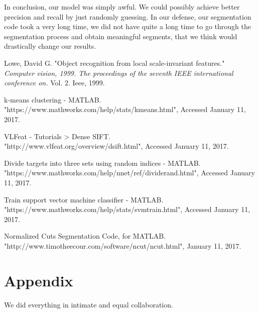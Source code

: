 \documentclass[conference]{IEEEtran}
\begin{document}
In conclusion, our model was simply awful. We could possibly achieve better precision and recall by just randomly guessing. In our defense, our segmentation code took a very long time, we did not have quite a long time to go through the segmentation process and obtain meaningful segments, that we think would drastically change our results. 


\begin{thebibliography}{20}


Lowe, David G. "Object recognition from local scale-invariant features." \textit{Computer vision, 1999. The proceedings of the seventh IEEE international conference on.} Vol. 2. Ieee, 1999.

 k-means clustering - MATLAB. \\
"https://www.mathworks.com/help/stats/kmeans.html", Accessed January 11, 2017.
  
 VLFeat - Tutorials > Dense SIFT. \\
"http://www.vlfeat.org/overview/dsift.html", Accessed January 11, 2017.

 Divide targets into three sets using random indices - MATLAB. \\
"https://www.mathworks.com/help/nnet/ref/dividerand.html", Accessed January 11, 2017.

 Train support vector machine classifier - MATLAB. \\
"https://www.mathworks.com/help/stats/svmtrain.html", Accessed January 11, 2017.

 Normalized Cuts Segmentation Code, for MATLAB. \\
"http://www.timotheecour.com/software/ncut/ncut.html", January 11, 2017.

\end{thebibliography}

\section*{Appendix}

We did everything in intimate and equal collaboration.


\end{document}
